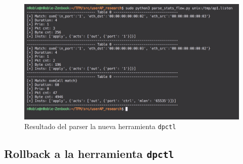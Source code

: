 \begin{figure}[ht]
    \centering
    \includegraphics[width=\textwidth]{archivos/img/dev/dpctl_4.png}
    \caption{Resultado del parser la nueva herramienta \texttt{dpctl}}
    \label{fig:dpctl_4}
\end{figure}

\subsection{Rollback a la herramienta \texttt{dpctl}}

